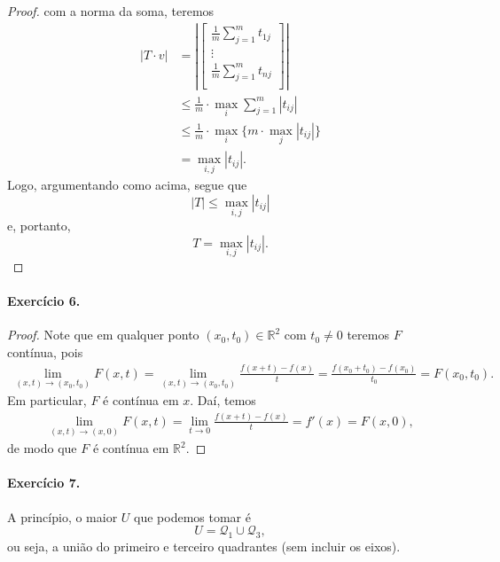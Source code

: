 \documentclass[12pt,a4paper]{article}
\newcommand{\R}{\mathbb{R}}
\begin{document}
\begin{proof}
        com a norma da soma, teremos
        \begin{align*}
            |T \cdot v|
            &= \left|\begin{bmatrix}
                \displaystyle{\frac{1}{m}\sum_{j=1}^m t_{1j}} \\
                \vdots \\
                \displaystyle{\frac{1}{m}\sum_{j=1}^m t_{nj}} \\
            \end{bmatrix}\right| \\
            &\leq \frac{1}{m}\cdot\max_i \displaystyle{\sum_{j=1}^m |t_{ij}|} \\
            &\leq \frac{1}{m}\cdot\max_i \{m\cdot\max_j |t_{ij}|\} \\
            &= \max_{i,j} |t_{ij}|.
        \end{align*}
        Logo, argumentando como acima, segue que
        \begin{equation*}
            |T| \leq \max_{i,j} |t_{ij}|
        \end{equation*}
        e, portanto,
        \begin{equation*}
            T = \max_{i,j} |t_{ij}|.
        \end{equation*}
    \end{proof}
\paragraph{Exercício 6.}
    \begin{proof}
        Note que em qualquer ponto $(x_0, t_0)\in\R^2$ com $t_0\neq 0$ teremos
        $F$ contínua, pois
        \begin{align*}
            \lim_{(x,t)\to (x_0,t_0)} F(x,t)
            = \lim_{(x,t)\to (x_0,t_0)} \frac{f(x+t) - f(x)}{t}
            = \frac{f(x_0+t_0) - f(x_0)}{t_0}
            = F(x_0, t_0).
        \end{align*}
        Em particular, $F$ é contínua em $x$. Daí, temos
        \begin{align*}
            \lim_{(x,t) \to (x, 0)} F(x,t)
            = \lim_{t\to 0} \frac{f(x+t) - f(x)}{t}
            = f'(x)
            = F(x,0),
        \end{align*}
        de modo que $F$ é contínua em $\R^2$.
    \end{proof}
\paragraph{Exercício 7.}
    A princípio, o maior $U$ que podemos tomar é
    \begin{equation*}
        U = \mathcal{Q}_1 \cup \mathcal{Q}_3,
    \end{equation*}
    ou seja, a união do primeiro e terceiro quadrantes (sem incluir os eixos).
\end{document}
